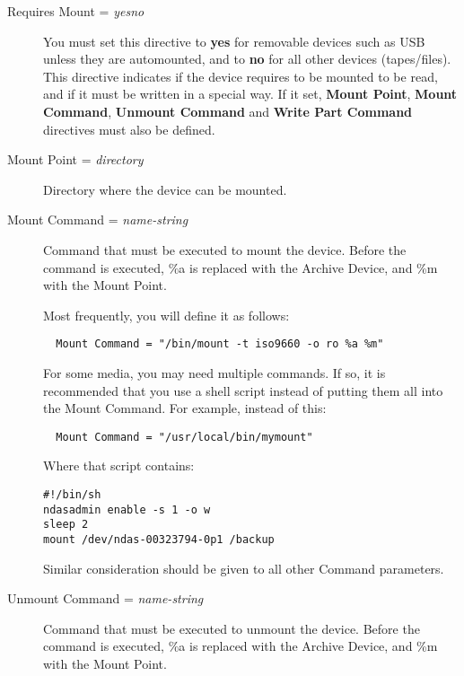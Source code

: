 \begin{description}

\item [Requires Mount = {\it yes\vb{}no}]
   You must set this directive to {\bf yes} for removable devices such as
   USB unless they are automounted, and to {\bf no} for all other devices
   (tapes/files).  This directive indicates if the device requires to be
   mounted to be read, and if it must be written in a special way.  If it
   set, {\bf Mount Point}, {\bf Mount Command}, {\bf Unmount Command} and
   {\bf Write Part Command} directives must also be defined.

\item [Mount Point = {\it directory}]
   Directory where the device can be mounted. 

\item [Mount Command = {\it name-string}]
   Command that must be executed to mount the device. Before the command is 
   executed, \%a is replaced with the Archive Device, and \%m with the Mount 
   Point.

   Most frequently, you will define it as follows:  

\footnotesize
\begin{verbatim}
  Mount Command = "/bin/mount -t iso9660 -o ro %a %m"
\end{verbatim}
\normalsize

For some media, you may need multiple commands.  If so, it is recommended
that you use a shell script instead of putting them all into the Mount
Command.  For example, instead of this:

\footnotesize
\begin{verbatim}
  Mount Command = "/usr/local/bin/mymount"
\end{verbatim}
\normalsize

Where that script contains:

\footnotesize
\begin{verbatim}
#!/bin/sh
ndasadmin enable -s 1 -o w
sleep 2
mount /dev/ndas-00323794-0p1 /backup
\end{verbatim}
\normalsize

Similar consideration should be given to all other Command parameters.

\item [Unmount Command = {\it name-string}]
   Command that must be executed to unmount the device. Before the command  is
   executed, \%a is replaced with the Archive Device, and \%m with the  Mount
   Point.


\end{description}
